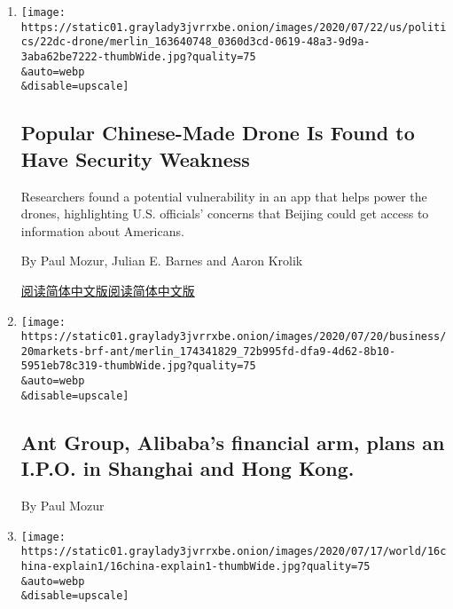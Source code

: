 \begin{enumerate}
\def\labelenumi{\arabic{enumi}.}
\item
  \href{/2020/07/23/us/politics/dji-drones-security-vulnerability.html}{}

  \texttt{[image: https://static01.graylady3jvrrxbe.onion/images/2020/07/22/us/politics/22dc-drone/merlin\_163640748\_0360d3cd-0619-48a3-9d9a-3aba62be7222-thumbWide.jpg?quality=75\\\&auto=webp\\\&disable=upscale]}

  \hypertarget{popular-chinese-made-drone-is-found-to-have-security-weakness}{%
  \subsection{Popular Chinese-Made Drone Is Found to Have Security
  Weakness}\label{popular-chinese-made-drone-is-found-to-have-security-weakness}}

  Researchers found a potential vulnerability in an app that helps power
  the drones, highlighting U.S. officials' concerns that Beijing could
  get access to information about Americans.

  By Paul Mozur, Julian E. Barnes and Aaron Krolik

  \href{https://cn.nytimes3xbfgragh.onion/usa/20200724/dji-drones-security-vulnerability/}{阅读简体中文版}\href{https://cn.nytimes3xbfgragh.onion/usa/20200724/dji-drones-security-vulnerability/}{阅读简体中文版}
\item
  \href{/live/2020/07/20/business/stock-market-today-coronavirus/ant-group-alibabas-financial-arm-plans-an-ipo-in-shanghai-and-hong-kong}{}

  \texttt{[image: https://static01.graylady3jvrrxbe.onion/images/2020/07/20/business/20markets-brf-ant/merlin\_174341829\_72b995fd-dfa9-4d62-8b10-5951eb78c319-thumbWide.jpg?quality=75\\\&auto=webp\\\&disable=upscale]}

  \hypertarget{ant-group-alibabas-financial-arm-plans-an-ipo-in-shanghai-and-hong-kong}{%
  \subsection{Ant Group, Alibaba's financial arm, plans an I.P.O. in
  Shanghai and Hong
  Kong.}\label{ant-group-alibabas-financial-arm-plans-an-ipo-in-shanghai-and-hong-kong}}

  By Paul Mozur
\item
  \href{/2020/07/16/world/asia/china-communist-party-travel-ban-explain.html}{}

  \texttt{[image: https://static01.graylady3jvrrxbe.onion/images/2020/07/17/world/16china-explain1/16china-explain1-thumbWide.jpg?quality=75\\\&auto=webp\\\&disable=upscale]}


\end{enumerate}
